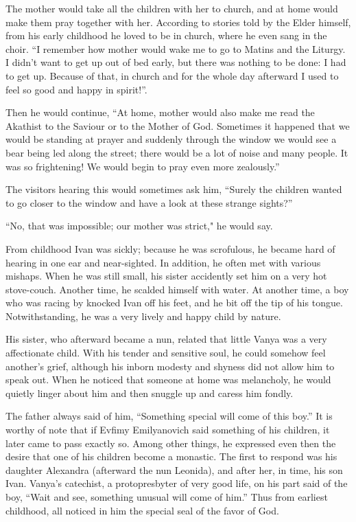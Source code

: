 The mother would take all the children with her to church, and at home would make them pray together with her. According to stories told by the Elder himself, from his early childhood he loved to be in church, where he even sang in the choir. “I remember how mother would wake me to go to Matins and the Liturgy. I didn't want to get up out of bed early, but there was nothing to be done: I had to get up. Because of that, in church and for the whole day afterward I used to feel so good and happy in spirit!”.

Then he would continue, “At home, mother would also make me read the Akathist to the Saviour or to the Mother of God. Sometimes it happened that we would be standing at prayer and suddenly through the window we would see a bear being led along the street; there would be a lot of noise and many people. It was so frightening! We would begin to pray even more zealously.”

The visitors hearing this would sometimes ask him, “Surely the children wanted to go closer to the window and have a look at these strange sights?”

“No, that was impossible; our mother was strict," he would say.

From childhood Ivan was sickly; because he was scrofulous, he became hard of hearing in one ear and near-sighted. In addition, he often met with various mishaps. When he was still small, his sister accidently set him on a very hot stove-couch. Another time, he scalded himself with water. At another time, a boy who was racing by knocked Ivan off his feet, and he bit off the tip of his tongue. Notwithstanding, he was a very lively and happy child by nature.

His sister, who afterward became a nun, related that little Vanya was a very affectionate child. With his tender and sensitive soul, he could somehow feel another's grief, although his inborn modesty and shyness did not allow him to speak out. When he noticed that someone at home was melancholy, he would quietly linger about him and then snuggle up and caress him fondly.

The father always said of him, “Something special will come of this boy.” It is worthy of note that if Evfimy Emilyanovich said something of his children, it later came to pass exactly so. Among other things, he expressed even then the desire that one of his children become a monastic. The first to respond was his daughter Alexandra (afterward the nun Leonida), and after her, in time, his son Ivan. Vanya's catechist, a protopresbyter of very good life, on his part said of the boy, “Wait and see, something unusual will come of him.” Thus from earliest childhood, all noticed in him the special seal of the favor of God.

